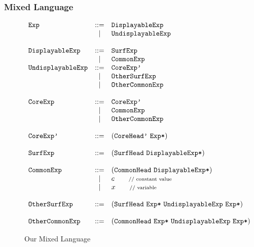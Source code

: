 \subsubsection{Mixed Language}
\begin{figure}[t]
\begin{centering}
{\footnotesize
\[
			\begin{array}{lcl}
			\mbox{\tt Exp} &::=& \mbox{\tt DisplayableExp}\\
			&|& \mbox{\tt UndisplayableExp}\\
\\
			\mbox{\tt DisplayableExp} &::=& \mbox{\tt SurfExp}\\
			&|& \mbox{\tt CommonExp}
\\
			\mbox{\tt UndisplayableExp} &::=& \mbox{\tt CoreExp'}\\
			&|& \mbox{\tt OtherSurfExp}\\
			&|& \mbox{\tt OtherCommonExp}\\
\\
			\mbox{\tt CoreExp} &::=& \mbox{\tt CoreExp'}\\
						 &|& \mbox{\tt CommonExp}\\
						 &|& \mbox{\tt OtherCommonExp}\\
\\
			\mbox{\tt CoreExp'} &::=& (\mbox{\tt CoreHead'}~\mbox{\tt Exp*})\\
\\
			\mbox{\tt SurfExp} &::=& (\mbox{\tt SurfHead}~\mbox{\tt DisplayableExp*})\\
\\
			\mbox{\tt CommonExp} &::=& (\mbox{\tt CommonHead}~\mbox{\tt DisplayableExp*})\\
			&|& c \qquad \mbox{{\scriptsize // constant value}}\\
			&|& x \qquad \mbox{{\scriptsize // variable}} \\
\\
			\mbox{\tt OtherSurfExp} &::=& (\mbox{\tt SurfHead}~\mbox{\tt Exp*}~\mbox{\tt UndisplayableExp}~\mbox{\tt Exp*})\\
\\
			\mbox{\tt OtherCommonExp} &::=& (\mbox{\tt CommonHead}~\mbox{\tt Exp*}~\mbox{\tt UndisplayableExp}~\mbox{\tt Exp*})
			\end{array}
			\]
}

\end{centering}
\caption{Our Mixed Language}
\label{fig:mix}
\end{figure}

